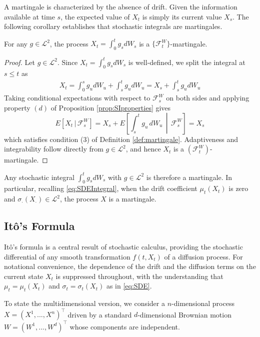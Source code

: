 A martingale is characterized by the absence of drift. Given the information available at time $s$, the expected value of $X_t$ is simply its current value $X_s$. The following corollary establishes that stochastic integrals are martingales. 

\begin{corollary}
    For any $g\in\mathcal{L}^2$, the process $X_t=\int_0^tg_sdW_s$ is a $\{\mathcal{F}_t^W\}$-martingale.
    \label{cor:SImartingale}
\end{corollary}

\begin{proof}
Let $g\in\mathcal{L}^2$. Since $X_t=\int_0^tg_sdW_s$ is well-defined, we split the integral at $s\leq t$ as
\begin{align*}
    X_t=\int_0^sg_udW_u+\int_s^tg_udW_u=X_s+\int_s^tg_udW_u
\end{align*}
Taking conditional expectations with respect to $\mathcal{F}_s^W$ on both sides and applying property $(d)$ of Proposition \ref{prop:SIproperties} gives
$$E\left[X_t\,|\, \mathcal{F}_s^W\right]=X_s+E\left[\int_s^t g_u\, dW_u\,\middle|\,\mathcal{F}_s^W\right]=X_s$$
which satisfies condition (3) of Definition \ref{def:martingale}. Adaptiveness and integrability follow directly from $g\in\mathcal{L}^2$, and hence $X_t$ is a $(\mathcal{F}_t^W)$-martingale.
\end{proof}

Any stochastic integral $\int_0^tg_sdW_s$ with $g\in\mathcal{L}^2$ is therefore a martingale. In particular, recalling \eqref{eq:SDEIntegral}, when the drift coefficient $\mu_t(X_t)$ is zero and $\sigma_\cdot(X_\cdot)\in\mathcal{L}^2$, the process $X$ is a martingale.


\subsection{Itô's Formula}

Itô's formula is a central result of stochastic calculus, providing the stochastic differential of any smooth transformation $f(t,X_t)$ of a diffusion process. For notational convenience, the dependence of the drift and the diffusion terms on the current state $X_t$ is suppressed throughout, with the understanding that $\mu_t=\mu_t(X_t)$ and $\sigma_t=\sigma_t(X_t)$ as in \eqref{eq:SDE}.

To state the multidimensional version, we consider a $n$-dimensional process $X=(X^1,...,X^n)^\top$ driven by a standard $d$-dimensional Brownian motion $W=(W^1,...,W^d)^\top$ whose components are independent.


